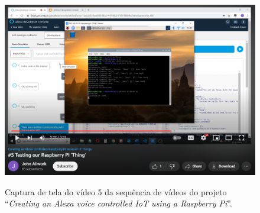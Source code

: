 \begin{figure}[htbp]
    \centering
    \caption{Captura de tela do vídeo 5 da sequência de vídeos do projeto ``\textit{Creating an Alexa voice controlled IoT using a Raspberry Pi}''.}
    \includegraphics[scale=0.75]{Imagens/testing_our_raspberrypi_thing.png}
    \label{fig:testing_our_raspberrypi_thing}
\end{figure}
